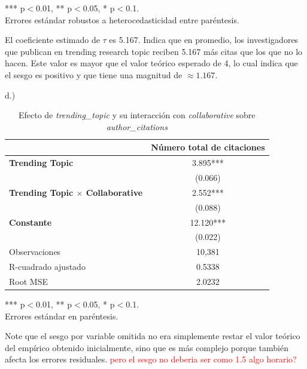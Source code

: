 \documentclass[a4paper, answers, addpoints, 11pt]{exam}
\begin{document}
\begin{itemize}
\begin{mdframed}
\begin{table}[H]
    \vspace{0.3cm}
    \footnotesize{*** p$<$0.01, ** p$<$0.05, * p$<$0.1. \\
    Errores estándar robustos a heterocedasticidad entre paréntesis.}
\end{table}

El coeficiente estimado de $\tau$ es 5.167. Indica que en promedio, los investigadores que publican en trending research topic reciben 5.167 más citas que los que no lo hacen. Este valor es  mayor que el valor teórico esperado de 4, lo cual indica que el sesgo es positivo y que tiene una magnitud de $\approx 1.167$.

        d.)
        \begin{table}[H]
    \centering
    \caption{Efecto de \textit{trending\_topic} y su interacción con \textit{collaborative} sobre \textit{author\_citations}}
    \label{tab:resultados}
    \begin{tabular}{l c}
        \toprule
        & Número total de citaciones \\
        \midrule
        \textbf{Trending Topic} & 3.895*** \\
        & (0.066) \\
        \textbf{Trending Topic $\times$ Collaborative} & 2.552*** \\
        & (0.088) \\
        \textbf{Constante} & 12.120*** \\
        & (0.022) \\
        \midrule
        Observaciones & 10,381 \\
        R-cuadrado ajustado & 0.5338 \\
        Root MSE & 2.0232 \\
        \bottomrule
    \end{tabular}
    
    \vspace{0.3cm}
    \footnotesize{*** p$<$0.01, ** p$<$0.05, * p$<$0.1. \\
    Errores estándar en paréntesis.}
\end{table}
Note que el sesgo por variable omitida no era simplemente restar el valor teórico del empírico obtenido inicialmente, sino que es más complejo porque también afecta los errores residuales.
\textcolor{red}{pero el sesgo no deberia ser como 1.5 algo horario?}
        
        \end{mdframed}
    

\end{itemize}
\bigskip
\end{document}
